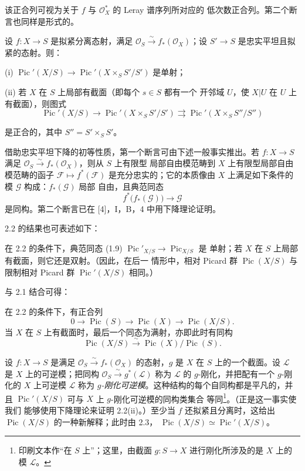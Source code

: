 该正合列可视为关于 $f$ 与 $\mathcal O_X^*$ 的 Leray 谱序列所对应的
低次数正合列。第二个断言也同样是形式的。

 设 $f:X\longrightarrow S$ 是拟紧分离态射，满足
$\mathcal O_S\xrightarrow{\sim}f_*(\mathcal O_X)$；设
$S'\longrightarrow S$ 是忠实平坦且拟紧的态射。则：

\noindent (i) $\operatorname{Pic}'(X/S)\longrightarrow
\operatorname{Pic}'(X\times_SS'/S')$ 是单射；

\noindent (ii) 若 $X$ 在 $S$ 上局部有截面（即每个 $s\in S$ 都有一个
开邻域 $U$，使 $X|U$ 在 $U$ 上有截面），则图式
\[
\operatorname{Pic}'(X/S)\longrightarrow
\operatorname{Pic}'(X\times_SS'/S')\rightrightarrows
\operatorname{Pic}'(X\times_SS''/S'')
\]

是正合的，其中 $S''=S'\times_SS'$。

借助忠实平坦下降的初等性质，第一个断言可由下述一般事实推出。若
$f:X\longrightarrow S$ 满足
$\mathcal O_S\xrightarrow{\sim}f_*(\mathcal O_X)$，则从 $S$ 上有限型
局部自由模范畴到 $X$ 上有限型局部自由模范畴的函子
$\mathcal F\longmapsto f^*(\mathcal F)$ 是充分忠实的；它的本质像由
$X$ 上满足如下条件的模 $\mathcal G$ 构成：$f_*(\mathcal G)$ 局部
自由，且典范同态
\[
f^*\bigl(f_*(\mathcal G)\bigr)\longrightarrow\mathcal G
\]
是同构。第二个断言已在 [4]，I，B，4 中用下降理论证明。

2.2 的结果也可表述如下：

 在 2.2 的条件下，典范同态 (1.9)
$\operatorname{Pic}'_{X/S}\longrightarrow\operatorname{Pic}_{X/S}$ 是
单射；若 $X$ 在 $S$ 上局部有截面，则它还是双射。（因此，在后一
情形中，相对 Picard 群 $\operatorname{Pic}(X/S)$ 与限制相对
Picard 群 $\operatorname{Pic}'(X/S)$ 相同。）

与 2.1 结合可得：

 在 2.2 的条件下，有正合列
\[
0\longrightarrow\operatorname{Pic}(S)\longrightarrow\operatorname{Pic}(X)
\longrightarrow\operatorname{Pic}(X/S).
\]
当 $X$ 在 $S$ 上有截面时，最后一个同态为满射，亦即此时有同构
\[
\operatorname{Pic}(X/S)\xrightarrow{\sim}
\operatorname{Pic}(X)/\operatorname{Pic}(S).
\]

 设 $f:X\longrightarrow S$ 是满足
$\mathcal O_S\xrightarrow{\sim}f_*(\mathcal O_X)$ 的态射，$g$ 是 $X$
在 $S$ 上的一个截面。设 $\mathcal L$ 是 $X$ 上的可逆模；把同构
$\mathcal O_S\xrightarrow{\sim}g^*(\mathcal L)$ 称为 $\mathcal L$ 的
$g$-刚化，并把配有一个 $g$-刚化的 $X$ 上可逆模 $\mathcal L$ 称为
\emph{$g$-刚化可逆模}。这种结构的每个自同构都是平凡的，并且
$\operatorname{Pic}'(X/S)$ 可与 $X$ 上 $g$-刚化可逆模的同构类集合
等同\footnote{印刷文本作“在 $S$ 上”；这里，由截面 $g:S\to X$
进行刚化所涉及的是 $X$ 上的模 $\mathcal L$。}。（正是这一事实使我们
能够使用下降理论来证明 2.2(ii)。）至少当 $f$ 还拟紧且分离时，这给出
$\operatorname{Pic}(X/S)$ 的一种新解释；此时由 2.3，
$\operatorname{Pic}(X/S)\simeq\operatorname{Pic}'(X/S)$。

